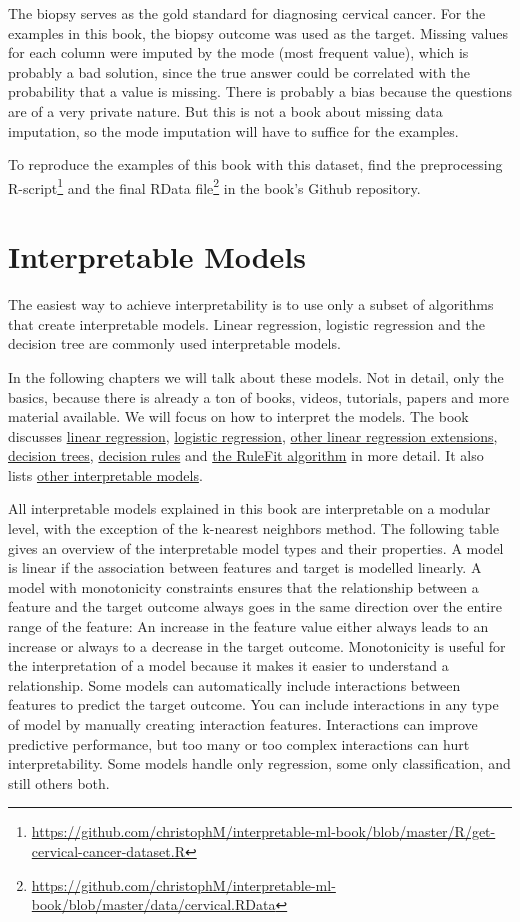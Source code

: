 \documentclass[
  10pt,
]{scrbook}
\renewcommand{\href}[2]{#2\footnote{\url{#1}}}
\begin{document}
The biopsy serves as the gold standard for diagnosing cervical cancer.
For the examples in this book, the biopsy outcome was used as the target.
Missing values for each column were imputed by the mode (most frequent value), which is probably a bad solution, since the true answer could be correlated with the probability that a value is missing.
There is probably a bias because the questions are of a very private nature.
But this is not a book about missing data imputation, so the mode imputation will have to suffice for the examples.

To reproduce the examples of this book with this dataset, find the
\href{https://github.com/christophM/interpretable-ml-book/blob/master/R/get-cervical-cancer-dataset.R}{preprocessing R-script} and the
\href{https://github.com/christophM/interpretable-ml-book/blob/master/data/cervical.RData}{final RData file} in the book's Github repository.

\hypertarget{simple}{%
\chapter{Interpretable Models}\label{simple}}

The easiest way to achieve interpretability is to use only a subset of algorithms that create interpretable models.
Linear regression, logistic regression and the decision tree are commonly used interpretable models.

In the following chapters we will talk about these models.
Not in detail, only the basics, because there is already a ton of books, videos, tutorials, papers and more material available.
We will focus on how to interpret the models.
The book discusses \protect\hyperlink{limo}{linear regression}, \protect\hyperlink{logistic}{logistic regression}, \protect\hyperlink{extend-lm}{other linear regression extensions}, \protect\hyperlink{tree}{decision trees}, \protect\hyperlink{rules}{decision rules} and \protect\hyperlink{rulefit}{the RuleFit algorithm} in more detail.
It also lists \protect\hyperlink{other-interpretable}{other interpretable models}.

All interpretable models explained in this book are interpretable on a modular level, with the exception of the k-nearest neighbors method.
The following table gives an overview of the interpretable model types and their properties.
A model is linear if the association between features and target is modelled linearly.
A model with monotonicity constraints ensures that the relationship between a feature and the target outcome always goes in the same direction over the entire range of the feature:
An increase in the feature value either always leads to an increase or always to a decrease in the target outcome.
Monotonicity is useful for the interpretation of a model because it makes it easier to understand a relationship.
Some models can automatically include interactions between features to predict the target outcome.
You can include interactions in any type of model by manually creating interaction features.
Interactions can improve predictive performance, but too many or too complex interactions can hurt interpretability.
Some models handle only regression, some only classification, and still others both.
\end{document}
